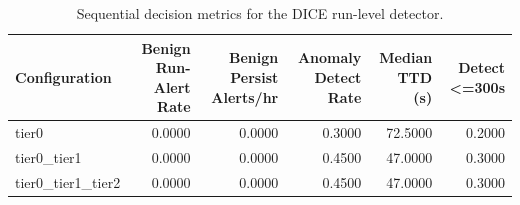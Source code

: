 \begin{table}[t]
\centering
\caption{Sequential decision metrics for the DICE run-level detector.}
\label{tab:dice_sequential_metrics}
\footnotesize
\begin{tabular}{lrrrrr}
\toprule
Configuration & Benign Run-Alert Rate & Benign Persist Alerts/hr & Anomaly Detect Rate & Median TTD (s) & Detect <=300s \\
\midrule
tier0 & 0.0000 & 0.0000 & 0.3000 & 72.5000 & 0.2000 \\
tier0_tier1 & 0.0000 & 0.0000 & 0.4500 & 47.0000 & 0.3000 \\
tier0_tier1_tier2 & 0.0000 & 0.0000 & 0.4500 & 47.0000 & 0.3000 \\
\bottomrule
\end{tabular}

\end{table}
